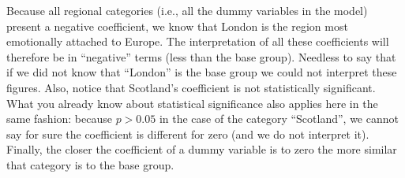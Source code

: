 \documentclass{article}
\begin{document}
Because all regional categories (i.e., all the dummy variables in the model) present a negative coefficient, we know that London is the region most emotionally attached to Europe. The interpretation of all these coefficients will therefore be in ``negative'' terms (less than the base group). Needless to say that if we did not know that ``London'' is the base group we could not interpret these figures. Also, notice that Scotland's coefficient is not statistically significant. What you already know about statistical significance also applies here in the same fashion: because $p > 0.05$ in the case of the category ``Scotland'', we cannot say for sure the coefficient is different for zero (and we do not interpret it). Finally, the closer the coefficient of a dummy variable is to zero the more similar that category is to the base group.   
\end{document}
